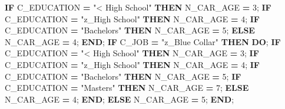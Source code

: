 \documentclass[]{article}
\newenvironment{Shaded}{\begin{snugshade}}{\end{snugshade}}
\newcommand{\KeywordTok}[1]{\textcolor[rgb]{0.13,0.29,0.53}{\textbf{{#1}}}}
\newcommand{\DecValTok}[1]{\textcolor[rgb]{0.00,0.00,0.81}{{#1}}}
\newcommand{\StringTok}[1]{\textcolor[rgb]{0.31,0.60,0.02}{{#1}}}
\newcommand{\NormalTok}[1]{{#1}}
\begin{document}
\begin{Shaded}
\begin{Highlighting}[]
            \KeywordTok{IF} \NormalTok{C_EDUCATION }\KeywordTok{=} \StringTok{"< High School"} \KeywordTok{THEN} \NormalTok{N_CAR_AGE }\KeywordTok{=} \DecValTok{3}\NormalTok{;}
            \KeywordTok{IF} \NormalTok{C_EDUCATION }\KeywordTok{=} \StringTok{"z_High School"} \KeywordTok{THEN} \NormalTok{N_CAR_AGE }\KeywordTok{=} \DecValTok{4}\NormalTok{;}
            \KeywordTok{IF} \NormalTok{C_EDUCATION }\KeywordTok{=} \StringTok{"Bachelors"} \KeywordTok{THEN} \NormalTok{N_CAR_AGE }\KeywordTok{=} \DecValTok{5}\NormalTok{;}
            \KeywordTok{ELSE} \NormalTok{N_CAR_AGE }\KeywordTok{=} \DecValTok{4}\NormalTok{;}
        \KeywordTok{END}\NormalTok{;}
        \KeywordTok{IF} \NormalTok{C_JOB }\KeywordTok{=} \StringTok{"z_Blue Collar"} \KeywordTok{THEN} \KeywordTok{DO}\NormalTok{;}
            \KeywordTok{IF} \NormalTok{C_EDUCATION }\KeywordTok{=} \StringTok{"< High School"} \KeywordTok{THEN} \NormalTok{N_CAR_AGE }\KeywordTok{=} \DecValTok{3}\NormalTok{;}
            \KeywordTok{IF} \NormalTok{C_EDUCATION }\KeywordTok{=} \StringTok{"z_High School"} \KeywordTok{THEN} \NormalTok{N_CAR_AGE }\KeywordTok{=} \DecValTok{4}\NormalTok{;}
            \KeywordTok{IF} \NormalTok{C_EDUCATION }\KeywordTok{=} \StringTok{"Bachelors"} \KeywordTok{THEN} \NormalTok{N_CAR_AGE }\KeywordTok{=} \DecValTok{5}\NormalTok{;}
            \KeywordTok{IF} \NormalTok{C_EDUCATION }\KeywordTok{=} \StringTok{"Masters"} \KeywordTok{THEN} \NormalTok{N_CAR_AGE }\KeywordTok{=} \DecValTok{7}\NormalTok{;}
            \KeywordTok{ELSE} \NormalTok{N_CAR_AGE }\KeywordTok{=} \DecValTok{4}\NormalTok{;}
        \KeywordTok{END}\NormalTok{;}
        \KeywordTok{ELSE} \NormalTok{N_CAR_AGE }\KeywordTok{=} \DecValTok{5}\NormalTok{;}
    \KeywordTok{END}\NormalTok{;}


\end{Highlighting}
\end{Shaded}
\end{document}
